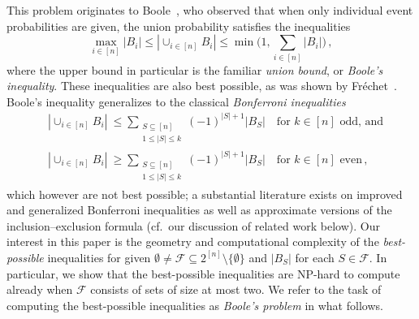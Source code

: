 \documentclass[11pt]{article}
\begin{document}
This problem originates to Boole~\cite{Boole1854}, who 
observed that when only individual event probabilities are given, 
the union probability satisfies 
the inequalities
\begin{equation}
\label{eq:boole-frechet}
\max_{i\in[n]}|B_i|
\leq
|\!\cup_{i\in[n]}B_i|
\leq
\min\bigl(1,\sum_{i\in[n]}|B_i|\bigr)\,,
\end{equation}
where the upper bound in particular is the familiar {\em union bound},
or {\em Boole's inequality}. These inequalities are also best possible,
as was shown by Fr\'echet~\cite{frechet1940, frechet1943}. Boole's inequality generalizes
to the classical {\em Bonferroni inequalities}~\cite{Bonferroni1936}
\[
\begin{split}
&|\!\cup_{i\in[n]}B_i|\ \leq\!\sum_{\substack{S\subseteq [n]\\1\leq |S|\leq k}}(-1)^{|S|+1}|B_S|\quad\text{for $k\in[n]$ odd, and}\\
&|\!\cup_{i\in[n]}B_i|\ \geq\!\sum_{\substack{S\subseteq [n]\\1\leq |S|\leq k}}(-1)^{|S|+1}|B_S|\quad\text{for $k\in[n]$ even}\,,
\end{split}
\]
which however are not best possible; a substantial literature exists on 
improved and generalized Bonferroni inequalities as well as approximate
versions of the inclusion--exclusion formula (cf.~our discussion of related
work below). Our interest in this paper is the geometry and computational 
complexity of the {\em best-possible} inequalities for given 
$\emptyset\neq\mathcal{F}\subseteq 2^{[n]}\setminus\{\emptyset\}$
and $|B_S|$ for each $S\in\mathcal{F}$. In particular, we show that the 
best-possible inequalities are NP-hard to compute already 
when $\mathcal{F}$ consists of sets of size at most two.
We refer to the task of computing the best-possible inequalities as
{\em Boole's problem} in what follows. 
\end{document}
